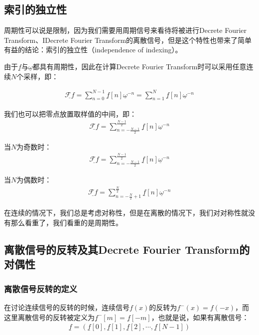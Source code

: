 
\subsection{索引的独立性}
周期性可以说是限制，因为我们需要用周期信号来看待将被进行Decrete Fourier Transform、IDecrete Fourier Transform的离散信号，但是这个特性也带来了简单有益的结论：索引的独立性（independence of indexing）。

由于$\underline{f}$与$\underline{\omega}$都具有周期性，因此在计算Decrete Fourier Transform时可以采用任意连续$N$个采样，即：

\begin{align*}
	\underline{\mathcal{F}f} =  \sum_{n=0}^{N-1}\underline{f}[n]\underline{\omega}^{-n} = \sum_{n=1}^{N}\underline{f}[n]\underline{\omega}^{-n}
\end{align*}

我们也可以把零点放置取样值的中间，即：
\begin{align*}
	\underline{\mathcal{F}f} =  \sum_{n=-\frac{N-1}{2}}^{\frac{N-1}{2}}\underline{f}[n]\underline{\omega}^{-n}
\end{align*}

当$N$为奇数时：
\begin{align*}
	\underline{\mathcal{F}f} = \sum_{n=-\frac{N-1}{2}}^{\frac{N-1}{2}}\underline{f}[n]\underline{\omega}^{-n}
\end{align*}

当$N$为偶数时：
\begin{align*}
	\underline{\mathcal{F}f} =  \sum_{n=-\frac{N}{2}+1}^{\frac{N}{2}}\underline{f}[n]\underline{\omega}^{-n}
\end{align*}

在连续的情况下，我们总是考虑对称性，但是在离散的情况下，我们对对称性就没有那么看重了，我们看重的是周期性。
\subsection{离散信号的反转及其Decrete Fourier Transform的对偶性}
\subsubsection{离散信号反转的定义}
在讨论连续信号的反转的时候，连续信号$f(x)$的反转为$f^-(x) = f(-x)$，而这里离散信号的反转被定义为$\underline{f}^{-}[m] = \underline{f}[-m]$，也就是说，如果有离散信号：
\begin{align*}
	\underline{f} = \left(\underline{f}[0],\underline{f}[1],\underline{f}[2],\cdots,\underline{f}[N-1] \right)
\end{align*}

